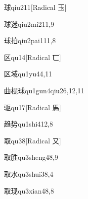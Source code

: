 \begin{entry}{球}{qiu2}{11}[Radical 玉]
\end{entry}

\begin{entry}{球迷}{qiu2mi2}{11,9}
\end{entry}

\begin{entry}{球拍}{qiu2pai1}{11,8}
\end{entry}

\begin{entry}{区}{qu1}{4}[Radical 匸]
\end{entry}

\begin{entry}{区域}{qu1yu4}{4,11}
\end{entry}

\begin{entry}{曲棍球}{qu1gun4qiu2}{6,12,11}
\end{entry}

\begin{entry}{驱}{qu1}{7}[Radical 馬]
\end{entry}

\begin{entry}{趋势}{qu1shi4}{12,8}
\end{entry}

\begin{entry}{取}{qu3}{8}[Radical 又]
\end{entry}

\begin{entry}{取胜}{qu3sheng4}{8,9}
\end{entry}

\begin{entry}{取水}{qu3shui3}{8,4}
\end{entry}

\begin{entry}{取现}{qu3xian4}{8,8}
\end{entry}

